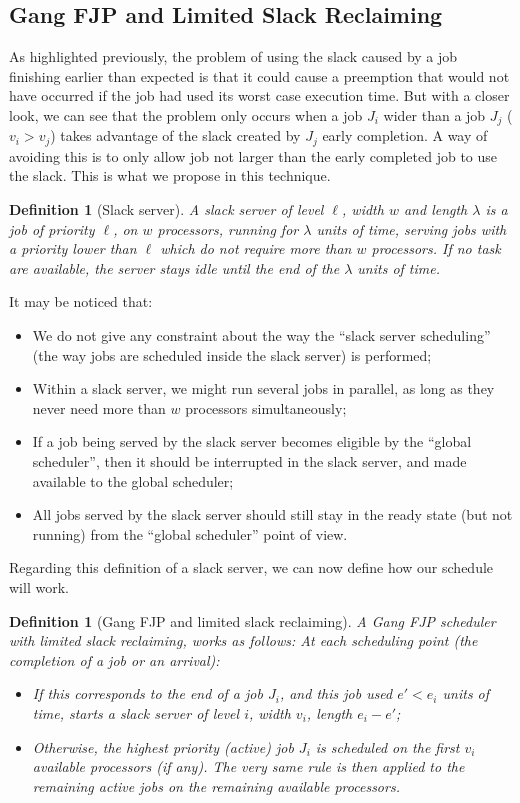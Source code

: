 \documentclass[a4paper]{article}
\newtheorem{definition}[theorem]{Definition}
\begin{document}
\subsection{Gang FJP and Limited Slack Reclaiming}
As highlighted previously, the problem of using the slack caused by a job finishing earlier than expected is that it could cause a preemption that would not have occurred if the job had used its worst case execution time. But with a closer look, we can see that the problem only occurs when a job $J_i$ wider than a job $J_j$ ($v_i>v_j$) takes advantage of the slack created by $J_j$ early completion. A way of avoiding this is to only allow job not larger than the early completed job to use the slack. This is what we propose in this technique.

\begin{definition}[Slack server]
A \emph{slack server} of level $\ell$, width $w$ and length $\lambda$ is a job of priority $\ell$, on $w$ processors, running for $\lambda$ units of time, serving jobs with a priority lower than $\ell$ which do not require more than $w$ processors. If no task are available, the server stays idle until the end of the $\lambda$ units of time.
\end{definition}

It may be noticed that:
\begin{itemize}
\item We do not give any constraint about the way the ``slack server scheduling'' (the way jobs are scheduled inside the slack server) is performed;
\item Within a slack server, we might run several jobs in parallel, as long as they never need more than $w$ processors simultaneously;
\item If a job being served by the slack server becomes eligible by the ``global scheduler'', then it should be interrupted in the slack server, and made available to the global scheduler;
\item All jobs served by the slack server should still stay in the ready state (but not running) from the ``global scheduler'' point of view.
\end{itemize}

Regarding this definition of a slack server, we can now define how our schedule will work.

\begin{definition}[Gang FJP and limited slack reclaiming]
A \emph{Gang FJP scheduler with limited slack reclaiming}, works as follows: At each scheduling point (the completion of a job or an arrival):
\begin{itemize}
\item If this corresponds to the end of a job $J_i$, and this job used $e'<e_i$ units of time, starts a slack server of level $i$, width $v_i$, length $e_i-e'$;
\item Otherwise, the highest priority (active) job $J_i$ is scheduled on the first $v_{i}$ available processors (if any). The very same rule is then applied to the remaining active jobs on the remaining available processors.
\end{itemize}
\end{definition}
\end{document}

